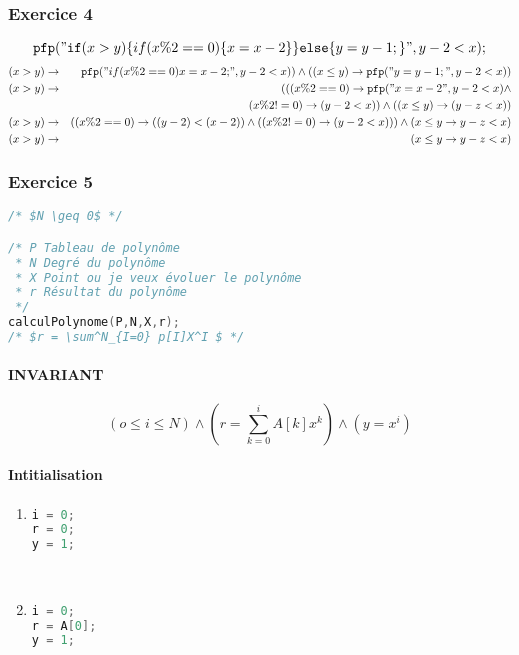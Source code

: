 \subsubsection{Exercice 4}
$$\pfp ("\ifp (x > y) \{ if(x \%2 ==  0) \{ x = x - 2\}\} \elsep \{y=y-1;\}", y-2 < x);$$
\begin{eqnarray*}
	(x > y) &\rightarrow& \pfp("if(x\%2 == 0) { x = x-2; } ", y-2 < x)) \wedge ( ( x \leq y) \rightarrow \pfp ("y = y-1;", y - 2 < x) )\\
	(x > y) &\rightarrow& ( ( (x \%2 = =0) \rightarrow \pfp ("x = x-2", y-2 < x) \wedge \\
	& &(x \% 2 != 0) \rightarrow(y-2 < x)) \wedge ( (x \leq y) \rightarrow (y-z < x))\\ 
	(x > y) &\rightarrow& ( (x\%2 = = 0)\rightarrow ( (y-2) < (x - 2) ) \wedge ( ( x\%2 != 0) \rightarrow (y-2 < x))) \wedge (x \leq y \rightarrow y-z < x) \\
	(x > y) &\rightarrow& (x \leq y \rightarrow y - z < x)
\end{eqnarray*}

\subsubsection{Exercice 5}
\begin{lstlisting}[language=C]
/* $N \geq 0$ */

/* P Tableau de polynôme
 * N Degré du polynôme
 * X Point ou je veux évoluer le polynôme
 * r Résultat du polynôme
 */
calculPolynome(P,N,X,r);
/* $r = \sum^N_{I=0} p[I]X^I $ */
\end{lstlisting}
	\paragraph{INVARIANT}
		$$(o \leq i \leq N) \wedge (r = \sum^i_{k=0} A[k]x^k) \wedge (y = x^i)$$
	\paragraph{Intitialisation}
		\begin{enumerate} 
			\item \begin{lstlisting}[language=C,numbers=none]
i = 0; 
r = 0; 
y = 1;
\end{lstlisting}~
		\item \begin{lstlisting}[language=C,numbers=none]
i = 0; 
r = A[0]; 
y = 1;
\end{lstlisting}
\end{enumerate}

